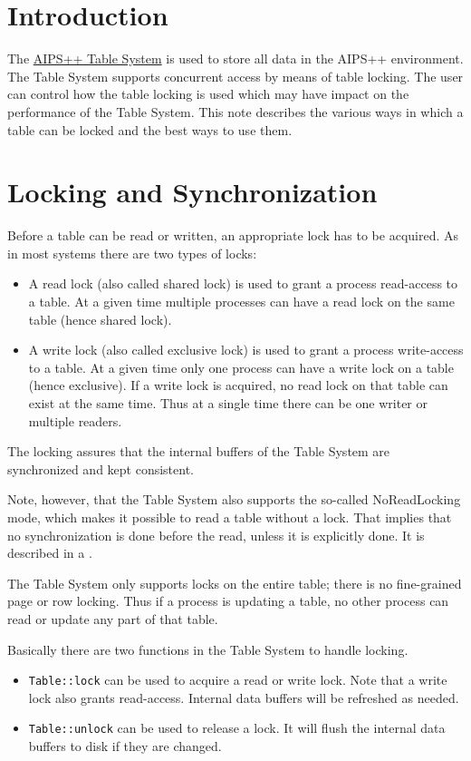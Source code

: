 \section{Introduction}
The \href{../255.html}{AIPS++ Table System}
is used to store all data in the AIPS++ environment.
The Table System supports concurrent access by means of table locking.
The user can control how the table locking is used which may have
impact on the performance of the Table System.
This note describes the various ways in which a table can be locked
and the best ways to use them.

\section{Locking and Synchronization}
Before a table can be read or written, an appropriate lock has to be
acquired. As in most systems there are two types of locks:
\begin{itemize}
\item A read lock (also called shared lock) is used to grant a process
read-access to a table. At a given time multiple processes can have
a read lock on the same table (hence shared lock).
\item A write lock (also called exclusive lock) is used to grant a
process write-access to a table. At a given time only one process can
have a write lock on a table (hence exclusive). If a write lock
is acquired, no read lock on that table can exist at the same time.
Thus at a single time there can be one writer or multiple readers.
\end{itemize}
The locking assures that the internal buffers of the Table
System are synchronized and kept consistent.

Note, however, that the Table System also supports the so-called
NoReadLocking mode, which makes it possible to read a table without a
lock. That implies that no synchronization is done before the read,
unless it is explicitly done. It is described in a
.

The Table System only supports locks on the entire table; there is
no fine-grained page or row locking. Thus if a process is updating a
table, no other process can read or update any part of that table.

\medskip
Basically there are two functions in the Table System to handle
locking.
\begin{itemize}
\item \texttt{Table::lock} can be used to acquire a read or write
lock. Note that a write lock also grants read-access.
Internal data buffers will be refreshed as needed.
\item \texttt{Table::unlock} can be used to release a lock.
It will flush the internal data buffers to disk if they are changed.
\end{itemize}


